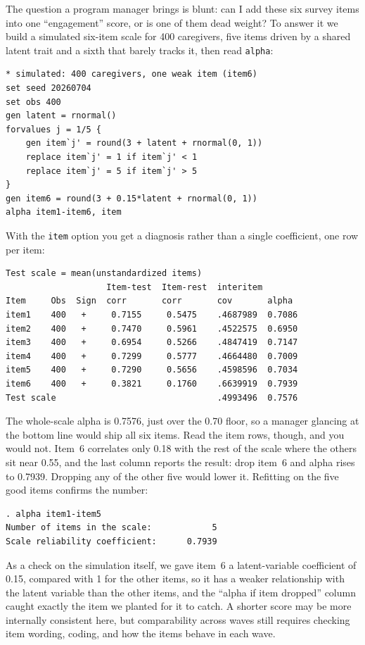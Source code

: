 \documentclass[
    a4paper,
    fontsize=10pt,
    twoside=true,
    numbers=noenddot,
]{kaobook}
\begin{document}
The question a program manager brings is blunt: can I add these six survey items into one \enquote{engagement} score, or is one of them dead weight? To answer it we build a simulated six-item scale for 400 caregivers, five items driven by a shared latent trait and a sixth that barely tracks it, then read \texttt{alpha}:
\par
{\footnotesize
\begin{verbatim}
* simulated: 400 caregivers, one weak item (item6)
set seed 20260704
set obs 400
gen latent = rnormal()
forvalues j = 1/5 {
    gen item`j' = round(3 + latent + rnormal(0, 1))
    replace item`j' = 1 if item`j' < 1
    replace item`j' = 5 if item`j' > 5
}
gen item6 = round(3 + 0.15*latent + rnormal(0, 1))
alpha item1-item6, item
\end{verbatim}
}
With the \texttt{item} option you get a diagnosis rather than a single coefficient, one row per item:
\par
{\footnotesize
\begin{verbatim}
Test scale = mean(unstandardized items)
                    Item-test  Item-rest  interitem
Item     Obs  Sign  corr       corr       cov       alpha
item1    400   +     0.7155     0.5475    .4687989  0.7086
item2    400   +     0.7470     0.5961    .4522575  0.6950
item3    400   +     0.6954     0.5266    .4847419  0.7147
item4    400   +     0.7299     0.5777    .4664480  0.7009
item5    400   +     0.7290     0.5656    .4598596  0.7034
item6    400   +     0.3821     0.1760    .6639919  0.7939
Test scale                                .4993496  0.7576
\end{verbatim}
}
The whole-scale alpha is 0.7576, just over the 0.70 floor, so a manager glancing at the bottom line would ship all six items. Read the item rows, though, and you would not. Item~6 correlates only 0.18 with the rest of the scale where the others sit near 0.55, and the last column reports the result: drop item~6 and alpha rises to 0.7939. Dropping any of the other five would lower it. Refitting on the five good items confirms the number:
\par
{\footnotesize
\begin{verbatim}
. alpha item1-item5
Number of items in the scale:            5
Scale reliability coefficient:      0.7939
\end{verbatim}
}
As a check on the simulation itself, we gave item~6 a latent-variable coefficient of 0.15, compared with 1 for the other items, so it has a weaker relationship with the latent variable than the other items, and the \enquote{alpha if item dropped} column caught exactly the item we planted for it to catch. A shorter score may be more internally consistent here, but comparability across waves still requires checking item wording, coding, and how the items behave in each wave.
\end{document}
